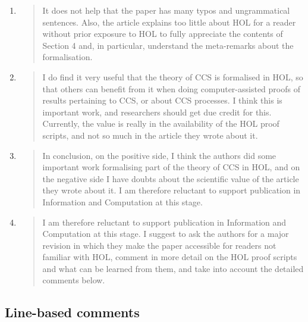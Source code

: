 \begin{enumerate}
\item \begin{quote}
    It does not help that the paper has many typos and ungrammatical
    sentences. Also, the article explains too little about HOL for a
    reader without prior exposure to HOL to fully appreciate the
    contents of Section 4 and, in particular, understand the
    meta-remarks about the formalisation.
  \end{quote}

\item \begin{quote}
    I do find it very useful that the theory of CCS is formalised in
    HOL, so that others can benefit from it when doing
    computer-assisted proofs of results pertaining to CCS, or about
    CCS processes. I think this is important work, and researchers
    should get due credit for this. Currently, the value is really in
    the availability of the HOL proof scripts, and not so much in the
    article they wrote about it.
  \end{quote}

\item \begin{quote}
    In conclusion, on the positive side, I think the authors did some
    important work formalising part of the theory of CCS in HOL, and
    on the negative side I have doubts about the scientific value of
    the article they wrote about it. I am therefore reluctant to
    support publication in Information and Computation at this stage.
  \end{quote}

\item \begin{quote}
    I am therefore reluctant to support publication in Information and
    Computation at this stage. I suggest to ask the authors for a
    major revision in which they make the paper accessible for readers
    not familiar with HOL, comment in more detail on the HOL proof
    scripts and what can be learned from them, and take into account
    the detailed comments below.
  \end{quote}
\end{enumerate}

\subsection*{Line-based comments}

